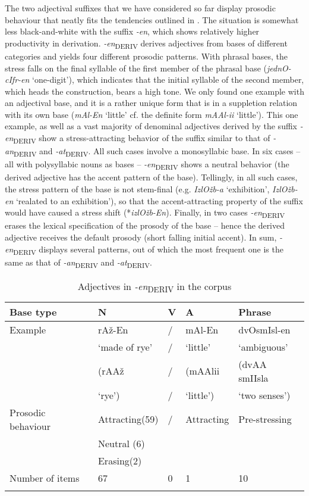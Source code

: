 \documentclass[output=paper]{langsci/langscibook}
\begin{document}
The two adjectival suffixes that we have considered so far display prosodic behaviour that neatly fits the tendencies outlined in . The situation is somewhat less black-and-white with the suffix \textit{-en}, which shows relatively higher productivity in derivation. 
{\textit{{-en}}}\textsubscript{DERIV} derives adjectives from bases of different categories and yields four different prosodic patterns. With phrasal bases, the stress falls on the final syllable of the first member of the phrasal base (\textit{jednO-cIfr-en} `one-digit'), which indicates that the initial syllable of the second member, which heads the construction, bears a high tone. We only found one example with an adjectival base, and it is a rather unique form that is in a suppletion relation with its own base (\textit{mAl-En} `little' cf. the definite form \textit{mAAl-ii} `little'). This one example, as well as a vast majority of denominal adjectives derived by the suffix {\textit{{-en}}}\textsubscript{DERIV} show a stress-attracting behavior of the suffix similar to that of {\textit{{-an}}}\textsubscript{DERIV} and {\textit{{-at}}}\textsubscript{DERIV}. All such cases involve a monosyllabic base. In six cases – all with polysyllabic nouns as bases – {\textit{{-en}}}\textsubscript{DERIV} shows a neutral behavior (the derived adjective has the accent pattern of the base). Tellingly, in all such cases, the stress pattern of the base is not stem-final (e.g. \textit{IzlOžb-a} `exhibition', \textit{IzlOžb-en} `realated to an exhibition'), so that the accent-attracting property of the suffix would have caused a stress shift (*\textit{izlOžb-En}). Finally, in two cases {\textit{{-en}}}\textsubscript{DERIV} erases the lexical specification of the prosody of the base – hence the derived adjective receives the default prosody (short falling initial accent). In sum, {\textit{{-en}}}\textsubscript{DERIV} displays several patterns, out of which the most frequent one is the same as that of {\textit{{-an}}}\textsubscript{DERIV} and {\textit{{-at}}}\textsubscript{DERIV}. 

\begin{table}
\caption{Adjectives in \textit {-en}\textsubscript{DERIV} in the corpus}
\label{tab1_d}
 \begin{tabular}{ l l l l l}
\lsptoprule  
 Base type & N & V & A & Phrase\\ %
\midrule
Example  &  rAž-En & / & mAl-En &  dvOsmIsl-en   \\
& `made of rye' & / & `little' & `ambiguous'  \\
& (rAAž  & / & (mAAlii  & (dvAA smIIsla \\
& `rye') & / & `little') & `two senses')\smallskip\\ 
Prosodic behaviour & Attracting(59) & / & Attracting & Pre-stressing\\ 
& Neutral (6)&&&\\ 
& Erasing(2)\smallskip&&&\\
 Number of items & 67 & 0 & 1 & 10\\
 \lspbottomrule
 \end{tabular}
\end{table}
\end{document}
